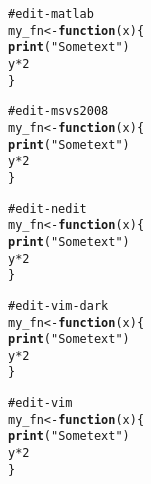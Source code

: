 \documentclass[12pt]{article}\usepackage{graphicx, color}
\makeatletter
\newcommand{\hlfunctioncall}[1]{\textcolor[rgb]{0.188235294117647,0.650980392156863,0.188235294117647}{\textbf{#1}}}%
\newcommand{\hlstring}[1]{\textcolor[rgb]{0.850980392156863,1,0.466666666666667}{#1}}%
\newcommand{\hlcomment}[1]{\textcolor[rgb]{0.533333333333333,0.533333333333333,0.533333333333333}{#1}}%
\newenvironment{kframe}{%
 \def\at@end@of@kframe{}%
 \ifinner\ifhmode%
  \def\at@end@of@kframe{\end{minipage}}%
  \begin{minipage}{\columnwidth}%
 \fi\fi%
 \def\FrameCommand##1{\hskip\@totalleftmargin \hskip-\fboxsep
 \colorbox{shadecolor}{##1}\hskip-\fboxsep
     \hskip-\linewidth \hskip-\@totalleftmargin \hskip\columnwidth}%
 \MakeFramed {\advance\hsize-\width
   \@totalleftmargin\z@ \linewidth\hsize
   \@setminipage}}%
 {\par\unskip\endMakeFramed%
 \at@end@of@kframe}
\newenvironment{knitrout}{}{} %
\makeatother
\begin{document}
\begin{knitrout}
\color{fgcolor}\begin{kframe}
\begin{alltt}
\hlcomment{# edit-matlab}
my_fn <- \hlfunctioncall{function}(x) \{
    \hlfunctioncall{print}(\hlstring{"Some text"})
    y * 2
\}
\end{alltt}
\end{kframe}
\end{knitrout}





\begin{knitrout}
\color{fgcolor}\begin{kframe}
\begin{alltt}
\hlcomment{# edit-msvs2008}
my_fn <- \hlfunctioncall{function}(x) \{
    \hlfunctioncall{print}(\hlstring{"Some text"})
    y * 2
\}
\end{alltt}
\end{kframe}
\end{knitrout}





\begin{knitrout}
\color{fgcolor}\begin{kframe}
\begin{alltt}
\hlcomment{# edit-nedit}
my_fn <- \hlfunctioncall{function}(x) \{
    \hlfunctioncall{print}(\hlstring{"Some text"})
    y * 2
\}
\end{alltt}
\end{kframe}
\end{knitrout}





\begin{knitrout}
\color{fgcolor}\begin{kframe}
\begin{alltt}
\hlcomment{# edit-vim-dark}
my_fn <- \hlfunctioncall{function}(x) \{
    \hlfunctioncall{print}(\hlstring{"Some text"})
    y * 2
\}
\end{alltt}
\end{kframe}
\end{knitrout}





\begin{knitrout}
\color{fgcolor}\begin{kframe}
\begin{alltt}
\hlcomment{# edit-vim}
my_fn <- \hlfunctioncall{function}(x) \{
    \hlfunctioncall{print}(\hlstring{"Some text"})
    y * 2
\}
\end{alltt}
\end{kframe}
\end{knitrout}
\end{document}
